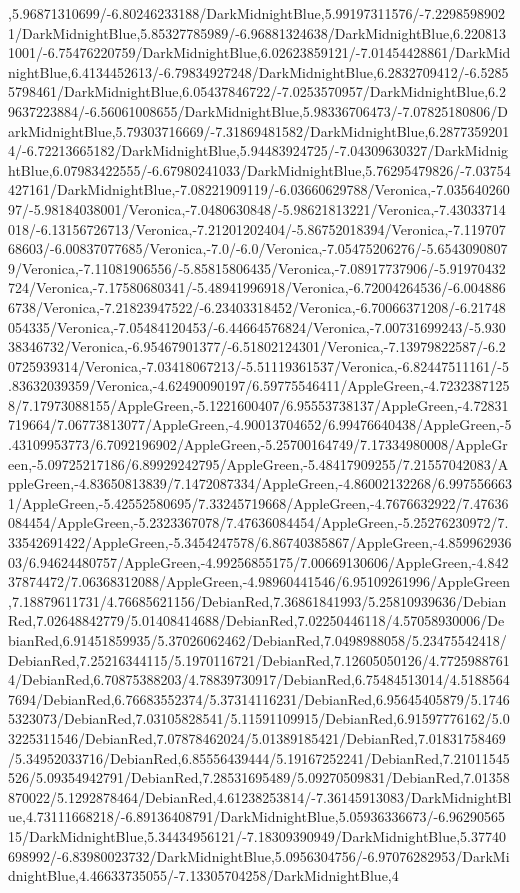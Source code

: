 {\begin{tikzternal}
,5.96871310699/-6.80246233188/DarkMidnightBlue,5.99197311576/-7.22985989021/DarkMidnightBlue,5.85327785989/-6.96881324638/DarkMidnightBlue,6.2208131001/-6.75476220759/DarkMidnightBlue,6.02623859121/-7.01454428861/DarkMidnightBlue,6.4134452613/-6.79834927248/DarkMidnightBlue,6.2832709412/-6.52855798461/DarkMidnightBlue,6.05437846722/-7.0253570957/DarkMidnightBlue,6.29637223884/-6.56061008655/DarkMidnightBlue,5.98336706473/-7.07825180806/DarkMidnightBlue,5.79303716669/-7.31869481582/DarkMidnightBlue,6.28773592014/-6.72213665182/DarkMidnightBlue,5.94483924725/-7.04309630327/DarkMidnightBlue,6.07983422555/-6.67980241033/DarkMidnightBlue,5.76295479826/-7.03754427161/DarkMidnightBlue,-7.08221909119/-6.03660629788/Veronica,-7.03564026097/-5.98184038001/Veronica,-7.0480630848/-5.98621813221/Veronica,-7.43033714018/-6.13156726713/Veronica,-7.21201202404/-5.86752018394/Veronica,-7.11970768603/-6.00837077685/Veronica,-7.0/-6.0/Veronica,-7.05475206276/-5.65430908079/Veronica,-7.11081906556/-5.85815806435/Veronica,-7.08917737906/-5.91970432724/Veronica,-7.17580680341/-5.48941996918/Veronica,-6.72004264536/-6.0048866738/Veronica,-7.21823947522/-6.23403318452/Veronica,-6.70066371208/-6.21748054335/Veronica,-7.05484120453/-6.44664576824/Veronica,-7.00731699243/-5.93038346732/Veronica,-6.95467901377/-6.51802124301/Veronica,-7.13979822587/-6.20725939314/Veronica,-7.03418067213/-5.51119361537/Veronica,-6.82447511161/-5.83632039359/Veronica,-4.62490090197/6.59775546411/AppleGreen,-4.72323871258/7.17973088155/AppleGreen,-5.1221600407/6.95553738137/AppleGreen,-4.72831719664/7.06773813077/AppleGreen,-4.90013704652/6.99476640438/AppleGreen,-5.43109953773/6.7092196902/AppleGreen,-5.25700164749/7.17334980008/AppleGreen,-5.09725217186/6.89929242795/AppleGreen,-5.48417909255/7.21557042083/AppleGreen,-4.83650813839/7.1472087334/AppleGreen,-4.86002132268/6.9975566631/AppleGreen,-5.42552580695/7.33245719668/AppleGreen,-4.7676632922/7.47636084454/AppleGreen,-5.2323367078/7.47636084454/AppleGreen,-5.25276230972/7.33542691422/AppleGreen,-5.3454247578/6.86740385867/AppleGreen,-4.85996293603/6.94624480757/AppleGreen,-4.99256855175/7.00669130606/AppleGreen,-4.84237874472/7.06368312088/AppleGreen,-4.98960441546/6.95109261996/AppleGreen,7.18879611731/4.76685621156/DebianRed,7.36861841993/5.25810939636/DebianRed,7.02648842779/5.01408414688/DebianRed,7.02250446118/4.57058930006/DebianRed,6.91451859935/5.37026062462/DebianRed,7.0498988058/5.23475542418/DebianRed,7.25216344115/5.1970116721/DebianRed,7.12605050126/4.77259887614/DebianRed,6.70875388203/4.78839730917/DebianRed,6.75484513014/4.51885647694/DebianRed,6.76683552374/5.37314116231/DebianRed,6.95645405879/5.17465323073/DebianRed,7.03105828541/5.11591109915/DebianRed,6.91597776162/5.03225311546/DebianRed,7.07878462024/5.01389185421/DebianRed,7.01831758469/5.34952033716/DebianRed,6.85556439444/5.19167252241/DebianRed,7.21011545526/5.09354942791/DebianRed,7.28531695489/5.09270509831/DebianRed,7.01358870022/5.1292878464/DebianRed,4.61238253814/-7.36145913083/DarkMidnightBlue,4.73111668218/-6.89136408791/DarkMidnightBlue,5.05936336673/-6.9629056515/DarkMidnightBlue,5.34434956121/-7.18309390949/DarkMidnightBlue,5.37740698992/-6.83980023732/DarkMidnightBlue,5.0956304756/-6.97076282953/DarkMidnightBlue,4.46633735055/-7.13305704258/DarkMidnightBlue,4
\end{tikzternal}}
